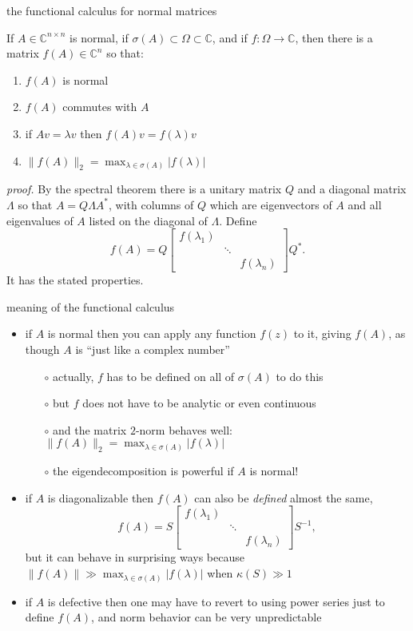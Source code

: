 \documentclass[10pt,hyperref]{beamer}
\newcommand{\CC}{\mathbb{C}}
\begin{document}
\begin{frame}{the functional calculus for normal matrices}

\begin{theorem}
If $A\in \CC^{n\times n}$ is normal, if $\sigma(A) \subset \Omega \subset \CC$, and if $f:\Omega \to \CC$, then there is a matrix $f(A)\in\CC^n$ so that:
\begin{enumerate}
\item $f(A)$ is normal
\item $f(A)$ commutes with $A$
\item if $Av=\lambda v$ then $f(A)v=f(\lambda)v$
\item $\|f(A)\|_2 = \max_{\lambda\in\sigma(A)} |f(\lambda)|$
\end{enumerate}
\end{theorem}

\emph{proof.}  By the spectral theorem there is a unitary matrix $Q$ and a diagonal matrix $\Lambda$ so that $A=Q\Lambda A^*$, with columns of $Q$ which are eigenvectors of $A$ and all eigenvalues of $A$ listed on the diagonal of $\Lambda$.  Define
    $$f(A) = Q \begin{bmatrix} f(\lambda_1) & & \\ & \ddots & \\ & & f(\lambda_n) \end{bmatrix} Q^*.$$
It has the stated properties.
\end{frame}


\begin{frame}{meaning of the functional calculus}

\begin{itemize}
\item if $A$ is normal then you can apply any function $f(z)$ to it, giving $f(A)$, as though $A$ is ``just like a complex number''
    \begin{itemize}
    \item[$\circ$] actually, $f$ has to be defined on all of $\sigma(A)$ to do this
    \item[$\circ$] but $f$ does not have to be analytic or even continuous
    \item[$\circ$] and the matrix $2$-norm behaves well: $\|f(A)\|_2 = \max_{\lambda\in\sigma(A)} |f(\lambda)|$
    \item[$\circ$] the eigendecomposition is powerful if $A$ is normal!
    \end{itemize}
\item if $A$ is diagonalizable then $f(A)$ can also be \emph{defined} almost the same,
\small
   $$f(A) = S \begin{bmatrix} f(\lambda_1) & & \\ & \ddots & \\ & & f(\lambda_n) \end{bmatrix} S^{-1},$$
\normalsize
but it can behave in surprising ways because $\|f(A)\| \gg \max_{\lambda\in\sigma(A)} |f(\lambda)|$ when $\kappa(S)\gg 1$
\item if $A$ is defective then one may have to revert to using power series just to define $f(A)$, and norm behavior can be very unpredictable
\end{itemize}
\end{frame}
\end{document}
